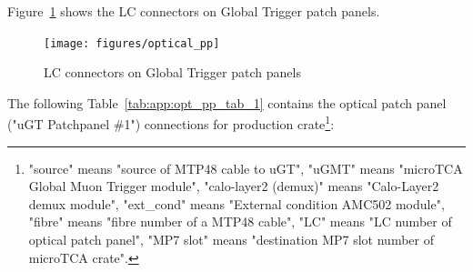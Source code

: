 Figure~\ref{fig:app:opt_pp} shows the LC connectors on Global Trigger patch panels.

\begin{figure}[htb]
\centering
\texttt{[image: figures/optical\_pp]}
\caption{LC connectors on Global Trigger patch panels}
\label{fig:app:opt_pp}
\end{figure}

The following Table~\ref{tab:app:opt_pp_tab_1} contains the optical patch panel ("uGT Patchpanel \#1") connections for production crate\footnote{"source" means "source of MTP48 cable to uGT", "uGMT" means "microTCA Global Muon Trigger module", "calo-layer2 (demux)" means "Calo-Layer2 demux module", "ext\_cond" means "External condition AMC502 module", "fibre" means "fibre number of a MTP48 cable", "LC" means "LC number of optical patch panel", "MP7 slot" means "destination MP7 slot number of microTCA crate".\label{note_ugt_opt_pp_1}}:

